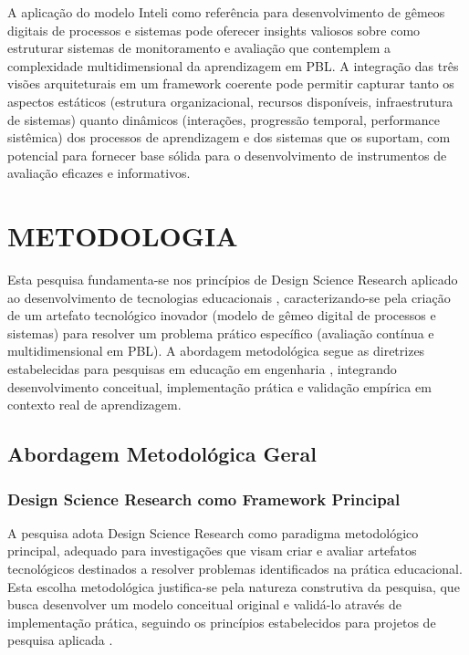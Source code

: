 \documentclass[12pt, a4paper, oneside]{abntex2}
\begin{document}
A aplicação do modelo Inteli como referência para desenvolvimento de gêmeos digitais de processos e sistemas pode oferecer insights valiosos sobre como estruturar sistemas de monitoramento e avaliação que contemplem a complexidade multidimensional da aprendizagem em PBL. A integração das três visões arquiteturais em um framework coerente pode permitir capturar tanto os aspectos estáticos (estrutura organizacional, recursos disponíveis, infraestrutura de sistemas) quanto dinâmicos (interações, progressão temporal, performance sistêmica) dos processos de aprendizagem e dos sistemas que os suportam, com potencial para fornecer base sólida para o desenvolvimento de instrumentos de avaliação eficazes e informativos.

\section{METODOLOGIA}

Esta pesquisa fundamenta-se nos princípios de Design Science Research aplicado ao desenvolvimento de tecnologias educacionais \cite{gil91}, caracterizando-se pela criação de um artefato tecnológico inovador (modelo de gêmeo digital de processos e sistemas) para resolver um problema prático específico (avaliação contínua e multidimensional em PBL). A abordagem metodológica segue as diretrizes estabelecidas para pesquisas em educação em engenharia \cite{andrade99}, integrando desenvolvimento conceitual, implementação prática e validação empírica em contexto real de aprendizagem.

\subsection{Abordagem Metodológica Geral}

\subsubsection{Design Science Research como Framework Principal}

A pesquisa adota Design Science Research como paradigma metodológico principal, adequado para investigações que visam criar e avaliar artefatos tecnológicos destinados a resolver problemas identificados na prática educacional. Esta escolha metodológica justifica-se pela natureza construtiva da pesquisa, que busca desenvolver um modelo conceitual original e validá-lo através de implementação prática, seguindo os princípios estabelecidos para projetos de pesquisa aplicada \cite{gil91}.
\end{document}
